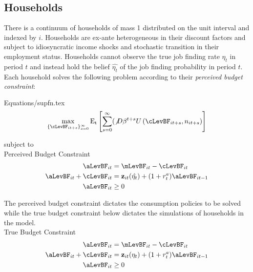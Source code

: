 \documentclass[titlepage]{\econtex}\providecommand{\texname}{Dissertation-Proposal}
\providecommand{\EqDir}{Equations}
\begin{document}
\subsection{Households}
\label{subsec:Households}

There is a continuum of households of mass 1 distributed on the unit
interval and indexed by $i$. Households are ex-ante heterogeneous in their discount factors and subject to idiosyncratic income shocks and stochastic transition in their employment status. Households cannot observe the true job finding rate $\eta_{t}$ in period $t$ and instead hold the belief $\hat{\eta_{t}}$ of the job finding probability in period $t$. Each household solves  the following problem according to their \textit{perceived budget constraint}:

\begin{verbatimwrite}{\EqDir/supfn.tex}
\begin{eqnarray}
  \label{eq:supfn}
  \max_{\{\cLevBF_{it+s}\}_{s=0}^{\infty}} \mathrm{E_{t}}\left[\sum_{s=0}^{\infty} (\not D \beta^{t+s} U\left(  \cLevBF_{i t+s}, n_{i t+s}\right)\right]
\end{eqnarray}
\end{verbatimwrite}
 

subject to \\

Perceived Budget Constraint \\

\begin{align*}
\aLevBF_{it}     &= \mLevBF_{it} - \cLevBF_{it}   \label{eq:DBCparts} \\
\aLevBF_{it} +\cLevBF_{it}    &= \mathbf{z}_{it}(\hat{\eta_{t}}) +   (1 + r^{a}_{t} ) \aLevBF_{it-1} \\ 
\aLevBF_{it}  &\geq 0 \\
\end{align*}



The perceived budget constraint dictates the consumption policies to be solved while the true budget constraint below dictates the simulations of households in the model.\\

True Budget Constraint \\ 
\begin{align*}
\aLevBF_{it}     &= \mLevBF_{it} - \cLevBF_{it}    \\
\aLevBF_{it} +\cLevBF_{it}    &= \mathbf{z}_{it}(\eta_{t}) +   (1 + r^{a}_{t} ) \aLevBF_{it-1} \\ 
\aLevBF_{it}  &\geq 0 \\
\end{align*}
\end{document}
